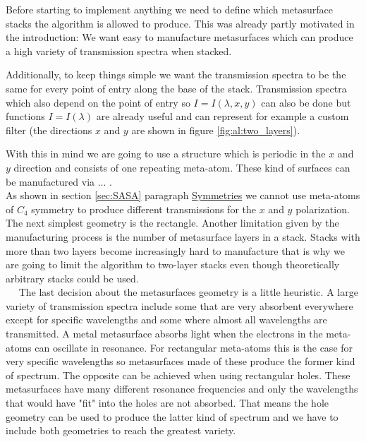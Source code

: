 Before starting to implement anything we need to define which metasurface stacks the algorithm is allowed to produce. This was already partly motivated in the introduction: We want easy to manufacture metasurfaces which can produce a high variety of transmission spectra when stacked.

Additionally, to keep things simple we want the transmission spectra to be the same for every point of entry along the base of the stack. Transmission spectra which also depend on the point of entry so $I = I(\lambda,x,y)$ can also be done \cite{Mueller2017} but functions $I = I(\lambda)$ are already useful and can represent for example a custom filter (the directions $x$ and $y$ are shown in figure \ref{fig:al:two_layers}).

With this in mind we are going to use a structure which is periodic in the
$x$ and $y$ direction and consists of one repeating meta-atom. These kind of surfaces can be manufactured via ... .
\\

\indent As shown in section \ref{sec:SASA} paragraph \hyperref[sec:symmetries]{Symmetries} we cannot use meta-atoms of $C_4$ symmetry to produce different transmissions for the $x$ and $y$ polarization. The next simplest geometry is the rectangle. Another limitation given by the manufacturing process is the number of metasurface layers in a stack. Stacks with more than two layers become increasingly hard to manufacture that is why we are going to limit the algorithm to two-layer stacks even though theoretically arbitrary stacks could be used.
\\

$\quad$ The last decision about the metasurfaces geometry is a little heuristic. A large variety of transmission spectra include some that are very absorbent everywhere except for specific wavelengths and some where almost all wavelengths are transmitted. A metal metasurface absorbs light when the electrons in the meta-atoms can oscillate in resonance. For rectangular meta-atoms this is the case for very specific wavelengths so metasurfaces made of these produce the former kind of spectrum. The opposite can be achieved when using rectangular holes. These metasurfaces have many different resonance frequencies and only the wavelengths that would have "fit" into the holes are not absorbed. That means the hole geometry can be used to produce the latter kind of spectrum and we have to include both geometries to reach the greatest variety.

